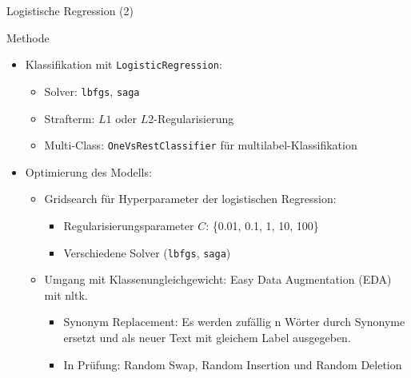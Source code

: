 \documentclass[aspectratio=169]{beamer} %
\begin{document}
\begin{frame}{Logistische Regression (2)}
    \begin{block}{Methode}
        \begin{itemize}
            \item Klassifikation mit \texttt{LogisticRegression}:
                  \begin{itemize}
                      \item Solver: \texttt{lbfgs}, \texttt{saga}
                      \item Strafterm: \(L1\) oder \(L2\)-Regularisierung
                      \item Multi-Class: \texttt{OneVsRestClassifier} f\"ur multilabel-Klassifikation
                  \end{itemize}
            \item Optimierung des Modells:
                  \begin{itemize}
                      \item Gridsearch f\"ur Hyperparameter der logistischen Regression:
                            \begin{itemize}
                                \item Regularisierungsparameter \(C\): \{0.01, 0.1, 1, 10, 100\}
                                \item Verschiedene Solver (\texttt{lbfgs}, \texttt{saga})
                            \end{itemize}
                      \item Umgang mit Klassenungleichgewicht: Easy Data Augmentation (EDA) mit nltk.
                            \begin{itemize}
                                \item Synonym Replacement: Es werden zuf\"allig n W\"orter durch Synonyme ersetzt und als neuer Text mit gleichem Label ausgegeben.
                                \item In Pr\"ufung: Random Swap, Random Insertion und Random Deletion
                            \end{itemize}
                  \end{itemize}
        \end{itemize}
    \end{block}
\end{frame}
\end{document}
